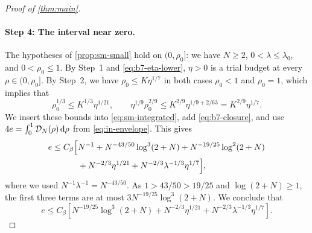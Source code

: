 \begin{proof}[Proof of \cref{thm:main}]
\paragraph{Step 4: The interval near zero.} The hypotheses of
\cref{prop:sm-small} hold on $(0,\rho_0]$: we have $N\ge2$,
$0<\lambda\le\lambda_0$, and $0<\rho_0\le1$. By Step~1 and
\eqref{eq:b7-eta-lower}, $\eta>0$ is a trial budget at every
$\rho\in(0,\rho_0]$. By Step~2, we have $\rho_0\le K\eta^{1/7}$ in both
cases $\rho_0<1$ and $\rho_0=1$, which implies that
\[
 \rho_0^{1/3}\le K^{1/3}\eta^{1/21},\qquad
 \eta^{1/9}\rho_0^{2/9}\le K^{2/9}\eta^{1/9+2/63}=K^{2/9}\eta^{1/7}.
\]
We insert these bounds into \eqref{eq:sm-integrated}, add
\eqref{eq:b7-closure}, and use $4e=\int_0^1\mathcal D_N(\rho)\,\mathrm d\rho$ from
\eqref{eq:in-envelope}. This gives
\[
\begin{aligned}
 e\le C_\beta\Bigl[
 &N^{-1}+N^{-43/50}\log^3(2+N)+N^{-19/25}\log^2(2+N)\\
 &+N^{-2/3}\eta^{1/21}+N^{-2/3}\lambda^{-1/3}\eta^{1/7}\Bigr],
\end{aligned}
\]
where we used $N^{-1}\lambda^{-1}=N^{-43/50}$. As $1>43/50>19/25$ and
$\log(2+N)\ge1$, the first three terms are at most
$3N^{-19/25}\log^3(2+N)$. We conclude that
\begin{equation}\label{eq:b7-normalized-input}
 e\le C_\beta\left[
 N^{-19/25}\log^3(2+N)+N^{-2/3}\eta^{1/21}
                     +N^{-2/3}\lambda^{-1/3}\eta^{1/7}\right].
\end{equation}


\end{proof}
